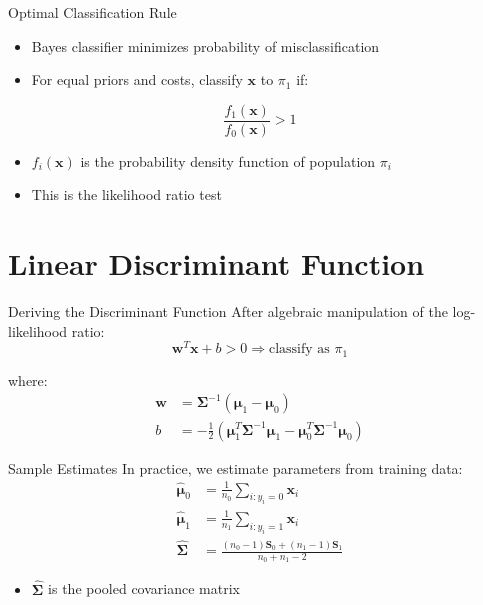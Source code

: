 \documentclass[aspectratio=169]{beamer}
\begin{document}
\begin{frame}{Optimal Classification Rule}
  \begin{itemize}
    \item Bayes classifier minimizes probability of misclassification
    \item For equal priors and costs, classify $\mathbf{x}$ to $\pi_1$ if:
  \end{itemize}
  $$\frac{f_1(\mathbf{x})}{f_0(\mathbf{x})} > 1$$
  \begin{itemize}
    \item $f_i(\mathbf{x})$ is the probability density function of population $\pi_i$
    \item This is the likelihood ratio test
  \end{itemize}
\end{frame}

\section{Linear Discriminant Function}
\begin{frame}{Deriving the Discriminant Function}
  After algebraic manipulation of the log-likelihood ratio:
  $$\mathbf{w}^T \mathbf{x} + b > 0 \Rightarrow \text{classify as } \pi_1$$
  
  where:
  \begin{align}
  \mathbf{w} &= \boldsymbol{\Sigma}^{-1}(\boldsymbol{\mu}_1 - \boldsymbol{\mu}_0) \\
  b &= -\frac{1}{2}(\boldsymbol{\mu}_1^T \boldsymbol{\Sigma}^{-1} \boldsymbol{\mu}_1 - \boldsymbol{\mu}_0^T \boldsymbol{\Sigma}^{-1} \boldsymbol{\mu}_0)
  \end{align}
\end{frame}

\begin{frame}{Sample Estimates}
  In practice, we estimate parameters from training data:
  \begin{align}
  \hat{\boldsymbol{\mu}}_0 &= \frac{1}{n_0} \sum_{i: y_i = 0} \mathbf{x}_i \\
  \hat{\boldsymbol{\mu}}_1 &= \frac{1}{n_1} \sum_{i: y_i = 1} \mathbf{x}_i \\
  \hat{\boldsymbol{\Sigma}} &= \frac{(n_0-1)\mathbf{S}_0 + (n_1-1)\mathbf{S}_1}{n_0 + n_1 - 2}
  \end{align}
  \begin{itemize}
    \item $\hat{\boldsymbol{\Sigma}}$ is the pooled covariance matrix
  \end{itemize}
\end{frame}
\end{document}
